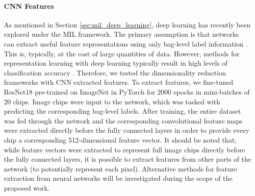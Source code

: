\paragraph{CNN Features} \label{exp:bag_level_cnn_feature_extraction} As mentioned in Section \ref{sec:mil_deep_learning}, deep learning has recently been explored under the MIL framework.  The primary assumption is that networks can extract useful feature representations using only bag-level label information \citep{Ghaffarzadegan2018MILVAE}.  This is, typically, at the cost of large quantities of data.  However, methods for representation learning with deep learning typically result in high levels of classification accuracy \citep{Bengio2014RepLearningReview}.  Therefore, we tested the dimensionality reduction frameworks with CNN extracted features.  To extract features, we fine-tuned ResNet18 \citep{He2015ResNet} pre-trained on ImageNet \citep{Deng2009ImageNet} in PyTorch for 2000 epochs in mini-batches of 20 chips.  Image chips were input to the network, which was tasked with predicting the corresponding bag-level labels.  After training, the entire dataset was fed through the network and the corresponding convolutional feature maps were extracted directly before the fully connected layers in order to provide every chip a corresponding 512-dimensional feature vector. It should be noted that, while feature vectors were extracted to represent full image chips directly before the fully connected layers, it is possible to extract features from other parts of the network (to potentially represent each pixel).  Alternative methods for feature extraction from neural networks will be investigated during the scope of the proposed work.

